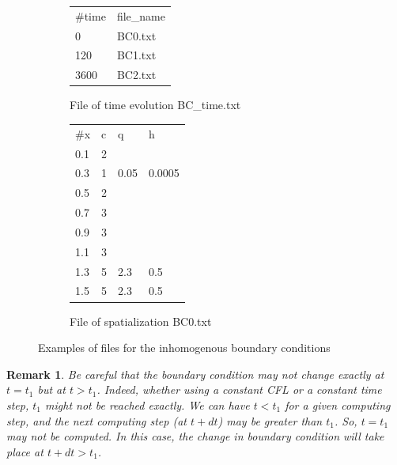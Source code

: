 \documentclass[a4paper, 11pt]{article}
\newtheorem{rmk}{Remark}
\begin{document}
\begin{description}
	      \begin{figure}[htbp]
		      \begin{subfigure}[b]{0.5\textwidth}
			      \centering
			      \begin{tt}
				      \begin{tabular}{ll}
					      \#time & file\_name \\
					      0      & BC0.txt    \\
					      120    & BC1.txt    \\
					      3600   & BC2.txt
				      \end{tabular}
			      \end{tt}
			      \caption{File of time evolution \textsf{BC\_time.txt}\label{Fig:BoundaryCondition:a}}
		      \end{subfigure}
		      \begin{subfigure}[b]{0.5\textwidth}
			      \centering
			      \begin{tt}
				      \begin{tabular}{llll}
					      \#x & c & q    & h      \\
					      0.1 & 2 &      &        \\
					      0.3 & 1 & 0.05 & 0.0005 \\
					      0.5 & 2 &      &        \\
					      0.7 & 3 &      &        \\
					      0.9 & 3 &      &        \\
					      1.1 & 3 &      &        \\
					      1.3 & 5 & 2.3  & 0.5    \\
					      1.5 & 5 & 2.3  & 0.5
				      \end{tabular}
			      \end{tt}
			      \caption{File of spatialization \textsf{BC0.txt}\label{Fig:BoundaryCondition:b}}
		      \end{subfigure}
		      \caption{Examples of files for the inhomogenous boundary conditions\label{Fig:BoundaryCondition}}
	      \end{figure}

	      \begin{rmk}
		      Be careful that the boundary condition may not change exactly at \(t=t_1\) but at \(t>t_1\).
		      Indeed, whether using a constant CFL or a constant time step, \(t_1\) might not be reached exactly.
		      We can have \(t<t_1\) for a given computing step, and the next computing step (at \(t+dt\)) may be greater than \(t_1\).
		      So, \(t=t_1\) may not be computed.
		      In this case, the change in boundary condition will take place at \(t+dt>t_1\).
	      \end{rmk}


\end{description}
\end{document}
